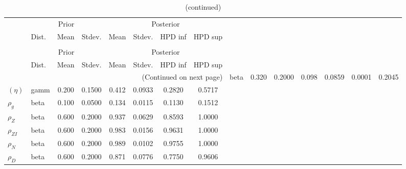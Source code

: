  
\begin{center}
\begin{longtable}{llcccccc} 
\caption{Results from Metropolis-Hastings (parameters)}
 \label{Table:MHPosterior:1}\\
\toprule 
  & \multicolumn{3}{c}{Prior}  &  \multicolumn{4}{c}{Posterior} \\
  \cmidrule(r{.75em}){2-4} \cmidrule(r{.75em}){5-8}
  & Dist. & Mean  & Stdev. & Mean & Stdev. & HPD inf & HPD sup\\
\midrule \endfirsthead 
\caption{(continued)}\\\toprule 
  & \multicolumn{3}{c}{Prior}  &  \multicolumn{4}{c}{Posterior} \\
  \cmidrule(r{.75em}){2-4} \cmidrule(r{.75em}){5-8}
  & Dist. & Mean  & Stdev. & Mean & Stdev. & HPD inf & HPD sup\\
\midrule \endhead 
\bottomrule \multicolumn{8}{r}{(Continued on next page)} \endfoot 
\bottomrule \endlastfoot 
$(\phi)$ & beta &   0.320 & 0.2000 &   0.098& 0.0859 &  0.0001 &  0.2045 \\ 
$(\eta)$ & gamm &   0.200 & 0.1500 &   0.412& 0.0933 &  0.2820 &  0.5717 \\ 
${\rho_g}$ & beta &   0.100 & 0.0500 &   0.134& 0.0115 &  0.1130 &  0.1512 \\ 
${\rho_Z}$ & beta &   0.600 & 0.2000 &   0.937& 0.0629 &  0.8593 &  1.0000 \\ 
${\rho_{ZI}}$ & beta &   0.600 & 0.2000 &   0.983& 0.0156 &  0.9631 &  1.0000 \\ 
${\rho_N}$ & beta &   0.600 & 0.2000 &   0.989& 0.0102 &  0.9755 &  1.0000 \\ 
${\rho_D}$ & beta &   0.600 & 0.2000 &   0.871& 0.0776 &  0.7750 &  0.9606 \\ 
\end{longtable}
 \end{center}
